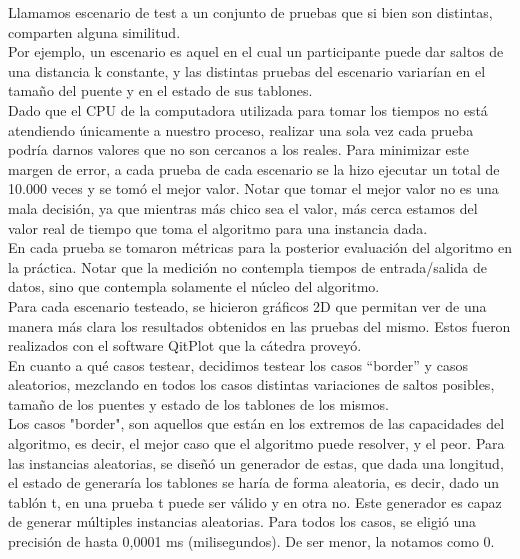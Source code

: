 \documentclass[10pt,a4paper]{article}
\begin{document}
\noindent Llamamos escenario de test a un conjunto de pruebas que si bien son distintas, comparten alguna similitud.\\

\noindent Por ejemplo, un escenario es aquel en el cual un participante puede dar saltos de una distancia k constante, y las distintas pruebas del escenario variarían en el tamaño del puente y en el estado de sus tablones.\\

\noindent Dado que el CPU de la computadora utilizada para tomar los tiempos no está atendiendo únicamente a nuestro proceso, realizar una sola vez cada prueba podría darnos valores que no son cercanos a los reales. Para minimizar este margen de error, a cada prueba de cada escenario se la hizo ejecutar un total de 10.000 veces y se tomó el mejor valor. Notar que tomar el mejor valor no es una mala decisión, ya que mientras más chico sea el valor, más cerca estamos del valor real de tiempo que toma el algoritmo para una instancia dada.\\

\noindent En cada prueba se tomaron métricas para la posterior evaluación del algoritmo en la práctica. Notar que la medición no contempla tiempos de entrada/salida de datos, sino que contempla solamente el núcleo del algoritmo.\\

\noindent Para cada escenario testeado, se hicieron gráficos 2D que permitan ver de una manera más clara los resultados obtenidos en las pruebas del mismo. Estos fueron realizados con el software QitPlot que la cátedra proveyó.\\

\noindent En cuanto a qué casos testear, decidimos testear los casos “border” y casos aleatorios, mezclando en todos los casos distintas variaciones de saltos posibles, tamaño de los puentes y estado de los tablones de los mismos.\\

\noindent Los casos "border", son aquellos que están en los extremos de las capacidades del algoritmo, es decir, el mejor caso que el algoritmo puede resolver, y el peor. 
Para las instancias aleatorias, se diseñó un generador de estas, que dada una longitud, el estado de generaría los tablones se haría de forma aleatoria, es decir, dado un tablón t, en una prueba t puede ser válido y en otra no.  Este generador es capaz de generar múltiples instancias aleatorias.
Para todos los casos, se eligió una precisión de hasta 0,0001 ms (milisegundos). De ser menor, la notamos como 0.\\
\end{document}
